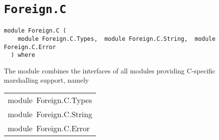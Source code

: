 \chapter{\texttt{Foreign.C}}
\label{module:Foreign.C}
\haddockbeginheader
{\haddockverb\begin{verbatim}
module Foreign.C (
    module Foreign.C.Types,  module Foreign.C.String,  module Foreign.C.Error
  ) where\end{verbatim}}
\haddockendheader

The module  combines the interfaces of all
 modules providing C-specific marshalling support, namely
\par

\begin{haddockdesc}
\item[\begin{tabular}{@{}l}
module\ Foreign.C.Types\\module\ Foreign.C.String\\module\ Foreign.C.Error
\end{tabular}]
\end{haddockdesc}